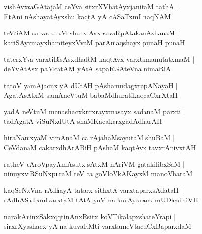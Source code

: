 \begin{shloka}
vishAvxsaGAtajaM ceYva sitxrXVhatAyxjanitaM tathA |\\
EtAni nAshayatAyxshu kaqtA yA cASaTxmI naqNAM
\end{shloka}

\begin{shloka}
teVSAM ca vacanaM shurxtAvx savaRpAtakanAshanaM |\\
kariSAyxmayxhamiteyxVvaM parAmaqshayx punaH punaH
\end{shloka}

\begin{shloka}
taterxYva varxtiBisAsxdhaRM kaqtAvx varxtamanutatxmaM |\\
deYvAtAsx paMcatAM yAtA sapaRGAteVna nimaRlA
\end{shloka}

\begin{shloka}
tatoV yamAjacnx yA dUtAH pAshamudagxrapANayaH |\\
AgatAsAtxM samAneVtuM babaMdhuratikaqcaCxrXtaH
\end{shloka}

\begin{shloka}
yadA neVtuM manashacxkurxrayxmasayx sadanaM parxti |\\
tadAgatA viSuNxdUtA shaMKacakarxgadAdharAH 
\end{shloka}

\begin{shloka}
hiraNamxyaM vimAnaM ca rAja{ha}MsayutaM shuBaM |\\
CeVdanaM cakarxdhArABiH pAshaM kaqtAvx tavxrAnivxtAH
\end{shloka}

\begin{shloka}
ratheV cAroVpayAmAsutx sAtxM nAriVM gatakilibxSaM |\\
ninuyxviRSuNxpuraM teV ca goVloVkAKayxM manoVharaM
\end{shloka}

\begin{shloka}
kaqSeNxVna rAdhayA tatarx sithxtA varxtaparxsAdataH |\\
rAdhASaTxmIvarxtaM tAtA yoV na kurAyxcacx mUDhadhiVH
\end{shloka}

\begin{shloka}
narakAninxSakxqqtinAnxRsitx koVTikalapxshateYrapi |\\
sirxrXyashacx yA na kuvaRMti varxtameVtacuCxBaparxdaM
\end{shloka}

